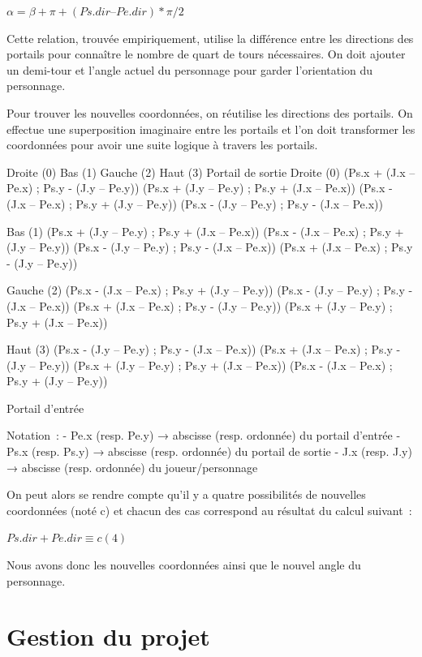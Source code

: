 \documentclass[11pt]{article}
\begin{document}
$\alpha = \beta + \pi + (Ps.dir – Pe.dir) * \pi / 2$

Cette relation, trouvée empiriquement, utilise la différence entre les directions des portails pour connaître le nombre de quart de tours nécessaires. On doit ajouter un demi-tour et l’angle actuel du personnage pour garder l’orientation du personnage.

Pour trouver les nouvelles coordonnées, on réutilise les directions des portails. On effectue une superposition imaginaire entre les portails et l’on doit transformer les coordonnées pour avoir une suite logique à travers les portails.


Droite (0)
Bas (1)
Gauche (2)
Haut (3)
Portail de sortie
Droite (0)
(Ps.x + (J.x – Pe.x) ;
Ps.y - (J.y – Pe.y))
(Ps.x + (J.y – Pe.y) ;
Ps.y + (J.x – Pe.x))
(Ps.x - (J.x – Pe.x) ;
Ps.y + (J.y – Pe.y))
(Ps.x - (J.y – Pe.y) ;
Ps.y - (J.x – Pe.x))

Bas (1)
(Ps.x + (J.y – Pe.y) ;
Ps.y + (J.x – Pe.x))
(Ps.x - (J.x – Pe.x) ;
Ps.y + (J.y – Pe.y))
(Ps.x - (J.y – Pe.y) ;
Ps.y - (J.x – Pe.x))
(Ps.x + (J.x – Pe.x) ;
Ps.y - (J.y – Pe.y))

Gauche (2)
(Ps.x - (J.x – Pe.x) ;
Ps.y + (J.y – Pe.y))
(Ps.x - (J.y – Pe.y) ;
Ps.y - (J.x – Pe.x))
(Ps.x + (J.x – Pe.x) ;
Ps.y - (J.y – Pe.y))
(Ps.x + (J.y – Pe.y) ;
Ps.y + (J.x – Pe.x))

Haut (3)
(Ps.x - (J.y – Pe.y) ;
Ps.y - (J.x – Pe.x))
(Ps.x + (J.x – Pe.x) ;
Ps.y - (J.y – Pe.y))
(Ps.x + (J.y – Pe.y) ;
Ps.y + (J.x – Pe.x))
(Ps.x - (J.x – Pe.x) ;
Ps.y + (J.y – Pe.y))

Portail d’entrée






Notation :	- Pe.x (resp. Pe.y) → abscisse (resp. ordonnée) du portail d’entrée
	- Ps.x (resp. Ps.y) → abscisse (resp. ordonnée) du portail de sortie
	- J.x (resp. J.y) → abscisse (resp. ordonnée) du joueur/personnage

On peut alors se rendre compte qu’il y a quatre possibilités de nouvelles coordonnées (noté c) et chacun des cas correspond au résultat du calcul suivant :

$Ps.dir + Pe.dir \equiv c (4)$

Nous avons donc les nouvelles coordonnées ainsi que le nouvel angle du personnage.

\section{Gestion du projet}
\end{document}
